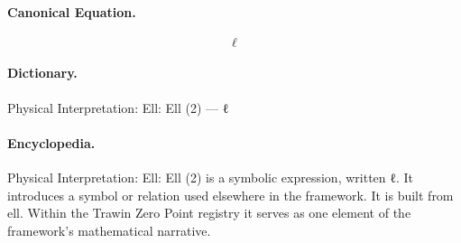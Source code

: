 \paragraph{Canonical Equation.}
\[
\ell
\]

\paragraph{Dictionary.}
Physical Interpretation: Ell: Ell (2) — ℓ

\paragraph{Encyclopedia.}
Physical Interpretation: Ell: Ell (2) is a symbolic expression, written ℓ. It introduces a symbol or relation used elsewhere in the framework. It is built from ell. Within the Trawin Zero Point registry it serves as one element of the framework's mathematical narrative.
